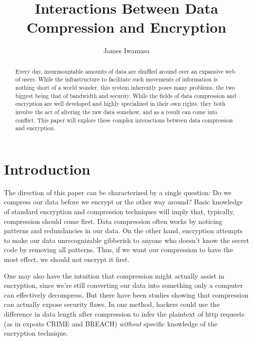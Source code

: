 \documentclass[11pt]{article}
\begin{document}
\title{Interactions Between Data Compression and Encryption}
\author{James Iwamasa}
\maketitle

\begin{abstract}
Every day, insurmountable amounts of data are shuffled around over an expansive web of users. 
While the infrastructure to facilitate such movements of information is nothing short of a world wonder, 
this system inherently poses many problems, the two biggest being that of bandwidth and security. 
While the fields of data compression and encryption are well developed and highly specialized in their 
own rights, they both involve the act of altering the raw data somehow, and as a result can come into 
conflict. This paper will explore these complex interactions between data compression and encryption.
\end{abstract}


\section{Introduction}\label{intro-sect}
The direction of this paper can be characterized by a single question: Do we compress our data before we 
encrypt or the other way around? Basic knowledge of standard encryption and compression techniques will 
imply that, typically, compression should come first. Data compression often works by noticing patterns and 
redundancies in our data. On the other hand, encryption attempts to make our data unrecognizable gibberish 
to anyone who doesn't know the secret code by removing all patterns. 
Thus, if we want our compression to have the most effect, we should not encrypt it first.

One may also have the intuition that compression might actually assist in encryption, 
since we're still converting our data into something only a computer can effectively decompress. 
But there have been studies\cite{kelsey, gluck} showing that compression can actually expose security flaws. 
In one method, hackers could use the difference in data length after compression to infer 
the plaintext of http requests (as in expoits CRIME and BREACH) \emph{without} specific 
knowledge of the encryption technique.
\end{document}
